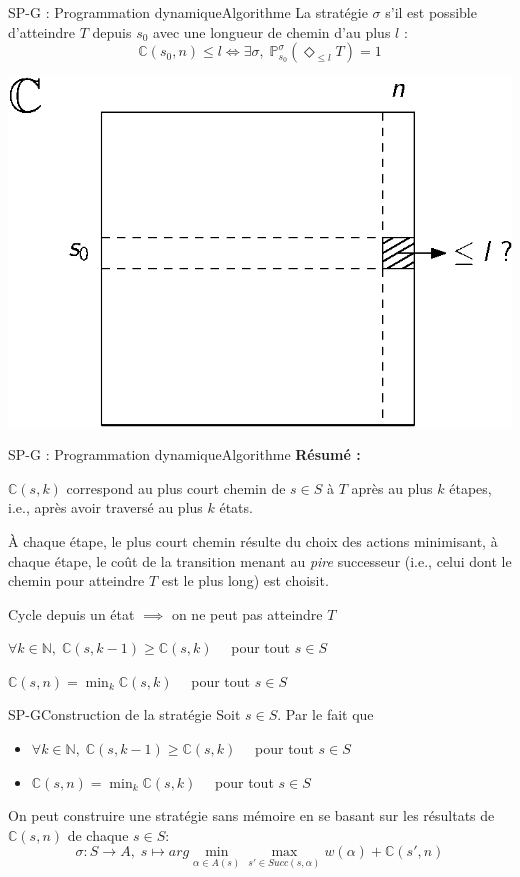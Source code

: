 \documentclass[compress]{beamer}
\theoremstyle{theorem}%
\begin{document}
\begin{frame}{SP-G : Programmation dynamique}{Algorithme}
La stratégie $\sigma$ s'il est possible d'atteindre $T$ depuis $s_0$ avec une longueur
de chemin d'au plus $l$ :
\[
  \mathbb{C}(s_0, n) \leq l \iff \exists \sigma, \; \mathbb{P}_{s_0}^\sigma(\Diamond_{\leq l} T) = 1
\]
\begin{center}
  \includegraphics[width=0.4\linewidth]{resources/sp-g2}
\end{center}
\end{frame}

\begin{frame}{SP-G : Programmation dynamique}{Algorithme}
  \textbf{\color{fibeamer@orange}Résumé :}
  \begin{itemize}
    \item $\mathbb{C}(s, k)$ correspond au plus court chemin de $s \in S$ à $T$ après \alert{au plus} $k$ étapes, i.e., après avoir traversé \alert{au plus} $k$ états.
    \item \`A chaque étape, le plus court chemin résulte du choix des actions minimisant, à chaque étape, le coût de la transition menant au \textit{pire} successeur (i.e., celui dont le chemin pour atteindre $T$ est le plus long) est choisit.
    \item Cycle depuis un état $\implies$ on ne peut pas atteindre $T$
    { \color{fibeamer@blue}
    \item $\forall k \in \mathbb{N}, \; \mathbb{C}(s, k-1) \geq \mathbb{C}(s, k)\quad$ pour tout $s \in S$
    \item $\mathbb{C}(s, n) = \min_k \mathbb{C}(s, k)\quad$ pour tout $s \in S$
    }
  \end{itemize}
\end{frame}

\begin{frame}{SP-G}{Construction de la stratégie}
Soit $s \in S$. Par le fait que
\begin{itemize}
    \item $\forall k \in \mathbb{N}, \; \mathbb{C}(s, k-1) \geq \mathbb{C}(s, k)\quad$ pour tout $s \in S$
    \item $\mathbb{C}(s, n) = \min_k \mathbb{C}(s, k)\quad$ pour tout $s \in S$
\end{itemize}
On peut construire une stratégie sans mémoire en se basant sur les résultats de $\mathbb{C}(s, n)$ de chaque $s \in S$:
\[
  \sigma : S \rightarrow A, \; s \mapsto arg \min_{\alpha \in A(s)} \max_{s' \in Succ(s, \alpha)} w(\alpha) + \mathbb{C}(s', n)
\]
\end{frame}
\end{document}
